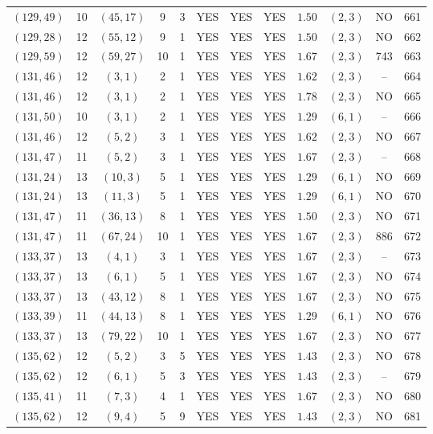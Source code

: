 \begin{longtable}{|c|c|c|c|c|c|c|c|c|c|c|c|}
$(129,49)$ & 10 & $(45,17)$ & 9 & 3 & YES & YES & YES & $1.50$ & $(2,3)$ & NO & 661\\
$(129,28)$ & 12 & $(55,12)$ & 9 & 1 & YES & YES & YES & $1.50$ & $(2,3)$ & NO & 662\\
$(129,59)$ & 12 & $(59,27)$ & 10 & 1 & YES & YES & YES & $1.67$ & $(2,3)$ & 743 & 663\\
$(131,46)$ & 12 & $(3,1)$ & 2 & 1 & YES & YES & YES & $1.62$ & $(2,3)$ & -- & 664\\
$(131,46)$ & 12 & $(3,1)$ & 2 & 1 & YES & YES & YES & $1.78$ & $(2,3)$ & NO & 665\\
$(131,50)$ & 10 & $(3,1)$ & 2 & 1 & YES & YES & YES & $1.29$ & $(6,1)$ & -- & 666\\
$(131,46)$ & 12 & $(5,2)$ & 3 & 1 & YES & YES & YES & $1.62$ & $(2,3)$ & NO & 667\\
$(131,47)$ & 11 & $(5,2)$ & 3 & 1 & YES & YES & YES & $1.67$ & $(2,3)$ & -- & 668\\
$(131,24)$ & 13 & $(10,3)$ & 5 & 1 & YES & YES & YES & $1.29$ & $(6,1)$ & NO & 669\\
$(131,24)$ & 13 & $(11,3)$ & 5 & 1 & YES & YES & YES & $1.29$ & $(6,1)$ & NO & 670\\
$(131,47)$ & 11 & $(36,13)$ & 8 & 1 & YES & YES & YES & $1.50$ & $(2,3)$ & NO & 671\\
$(131,47)$ & 11 & $(67,24)$ & 10 & 1 & YES & YES & YES & $1.67$ & $(2,3)$ & 886 & 672\\
$(133,37)$ & 13 & $(4,1)$ & 3 & 1 & YES & YES & YES & $1.67$ & $(2,3)$ & -- & 673\\
$(133,37)$ & 13 & $(6,1)$ & 5 & 1 & YES & YES & YES & $1.67$ & $(2,3)$ & NO & 674\\
$(133,37)$ & 13 & $(43,12)$ & 8 & 1 & YES & YES & YES & $1.67$ & $(2,3)$ & NO & 675\\
$(133,39)$ & 11 & $(44,13)$ & 8 & 1 & YES & YES & YES & $1.29$ & $(6,1)$ & NO & 676\\
$(133,37)$ & 13 & $(79,22)$ & 10 & 1 & YES & YES & YES & $1.67$ & $(2,3)$ & NO & 677\\
$(135,62)$ & 12 & $(5,2)$ & 3 & 5 & YES & YES & YES & $1.43$ & $(2,3)$ & NO & 678\\
$(135,62)$ & 12 & $(6,1)$ & 5 & 3 & YES & YES & YES & $1.43$ & $(2,3)$ & -- & 679\\
$(135,41)$ & 11 & $(7,3)$ & 4 & 1 & YES & YES & YES & $1.67$ & $(2,3)$ & NO & 680\\
$(135,62)$ & 12 & $(9,4)$ & 5 & 9 & YES & YES & YES & $1.43$ & $(2,3)$ & NO & 681\\

\end{longtable}
